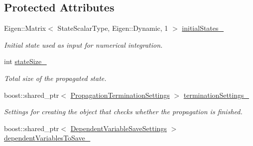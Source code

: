 \subsection*{Protected Attributes}
\begin{DoxyCompactItemize}
\item 
Eigen\+::\+Matrix$<$ State\+Scalar\+Type, Eigen\+::\+Dynamic, 1 $>$ \hyperlink{classtudat_1_1propagators_1_1PropagatorSettings_a76fe3605ffe32130c5343601125188b4}{initial\+States\+\_\+}\hypertarget{classtudat_1_1propagators_1_1PropagatorSettings_a76fe3605ffe32130c5343601125188b4}{}\label{classtudat_1_1propagators_1_1PropagatorSettings_a76fe3605ffe32130c5343601125188b4}

\begin{DoxyCompactList}\small\item\em Initial state used as input for numerical integration. \end{DoxyCompactList}\item 
int \hyperlink{classtudat_1_1propagators_1_1PropagatorSettings_a7325c41d712d7bbeeb12ef8969b235c3}{state\+Size\+\_\+}\hypertarget{classtudat_1_1propagators_1_1PropagatorSettings_a7325c41d712d7bbeeb12ef8969b235c3}{}\label{classtudat_1_1propagators_1_1PropagatorSettings_a7325c41d712d7bbeeb12ef8969b235c3}

\begin{DoxyCompactList}\small\item\em Total size of the propagated state. \end{DoxyCompactList}\item 
boost\+::shared\+\_\+ptr$<$ \hyperlink{classtudat_1_1propagators_1_1PropagationTerminationSettings}{Propagation\+Termination\+Settings} $>$ \hyperlink{classtudat_1_1propagators_1_1PropagatorSettings_ae7f409af6d3e5841a2244ec15f440984}{termination\+Settings\+\_\+}\hypertarget{classtudat_1_1propagators_1_1PropagatorSettings_ae7f409af6d3e5841a2244ec15f440984}{}\label{classtudat_1_1propagators_1_1PropagatorSettings_ae7f409af6d3e5841a2244ec15f440984}

\begin{DoxyCompactList}\small\item\em Settings for creating the object that checks whether the propagation is finished. \end{DoxyCompactList}\item 
boost\+::shared\+\_\+ptr$<$ \hyperlink{classtudat_1_1propagators_1_1DependentVariableSaveSettings}{Dependent\+Variable\+Save\+Settings} $>$ \hyperlink{classtudat_1_1propagators_1_1PropagatorSettings_a728be568d26f10b8eb8f97da695e6f83}{dependent\+Variables\+To\+Save\+\_\+}\hypertarget{classtudat_1_1propagators_1_1PropagatorSettings_a728be568d26f10b8eb8f97da695e6f83}{}\label{classtudat_1_1propagators_1_1PropagatorSettings_a728be568d26f10b8eb8f97da695e6f83}


\end{DoxyCompactItemize}
